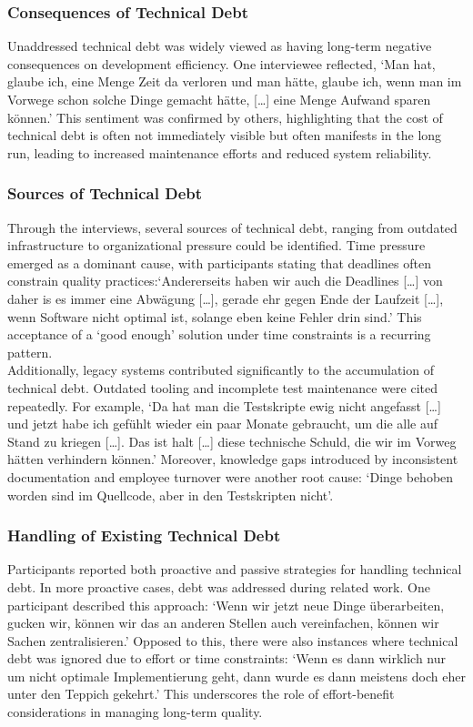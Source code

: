 \subsubsection{Consequences of Technical Debt}
Unaddressed technical debt was widely viewed as having long-term negative consequences on development efficiency. One interviewee reflected, `Man hat, glaube ich, eine Menge Zeit da verloren und man hätte, glaube ich, wenn man im Vorwege schon solche Dinge gemacht hätte, [\ldots] eine Menge Aufwand sparen können.'
This sentiment was confirmed by others, highlighting that the cost of technical debt is often not immediately visible but often manifests in the long run, leading to increased maintenance efforts and reduced system reliability.\\

\subsubsection{Sources of Technical Debt}
Through the interviews, several sources of technical debt, ranging from outdated infrastructure to organizational pressure could be identified. Time pressure emerged as a dominant cause, with participants stating that deadlines often constrain quality practices:`Andererseits haben wir auch die Deadlines [\ldots] von daher is es immer eine Abwägung
[\ldots], gerade ehr gegen Ende der Laufzeit [\ldots], wenn Software nicht optimal ist, solange eben keine Fehler drin sind.' This acceptance of a `good enough' solution under time constraints is a recurring pattern.\\

Additionally, legacy systems contributed significantly to the accumulation of technical debt. Outdated tooling and incomplete test maintenance were cited repeatedly. For example, `Da hat man die Testskripte ewig nicht angefasst [\ldots] und jetzt habe ich gefühlt wieder ein paar Monate gebraucht, um die alle auf Stand zu kriegen [\ldots].
Das ist halt [\ldots] diese technische Schuld, die wir im Vorweg hätten verhindern können.' Moreover, knowledge gaps introduced by inconsistent documentation and employee turnover were another root cause: `Dinge behoben worden sind im Quellcode, aber in den Testskripten nicht'.

\subsubsection{Handling of Existing Technical Debt}
Participants reported both proactive and passive strategies for handling technical debt. In more proactive cases, debt was addressed during related work. One participant described this approach: `Wenn wir jetzt neue Dinge überarbeiten, gucken wir, können wir das an anderen Stellen auch vereinfachen, können wir Sachen zentralisieren.'
Opposed to this, there were also instances where technical debt was ignored due to effort or time constraints: `Wenn es dann wirklich nur um nicht optimale Implementierung geht, dann wurde es dann meistens doch eher unter den Teppich gekehrt.'
This underscores the role of effort-benefit considerations in managing long-term quality.\\


